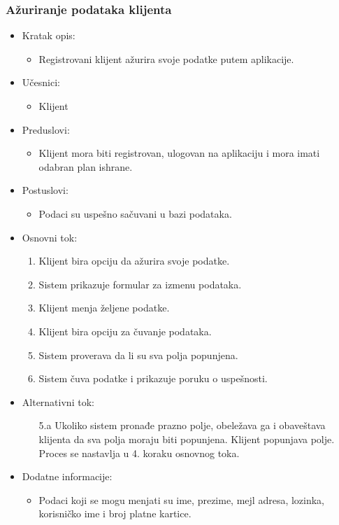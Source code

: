\subsubsection{Ažuriranje podataka klijenta}

\begin{itemize}
    \item Kratak opis:
        \begin{itemize}
            \item Registrovani klijent ažurira svoje podatke putem aplikacije.
        \end{itemize}
    \item Učesnici:
        \begin{itemize}
            \item Klijent
        \end{itemize}
    \item Preduslovi:
        \begin{itemize}
            \item Klijent mora biti registrovan, ulogovan na aplikaciju i mora imati odabran plan ishrane.
        \end{itemize}
    \item Postuslovi:
        \begin{itemize}
            \item Podaci su uspešno sačuvani u bazi podataka.
        \end{itemize}
    \item Osnovni tok:
        \begin{enumerate}
            \item Klijent bira opciju da ažurira svoje podatke.
            \item Sistem prikazuje formular za izmenu podataka.
            \item Klijent menja željene podatke. 
            \item Klijent bira opciju za čuvanje podataka.
            \item Sistem proverava da li su sva polja popunjena.
            \item Sistem čuva podatke i prikazuje poruku o uspešnosti.
        \end{enumerate}
    \item Alternativni tok:
        \begin{itemize}
            \item[5.a] Ukoliko sistem pronađe prazno polje, obeležava ga i obaveštava klijenta da sva polja moraju biti popunjena. Klijent popunjava polje. Proces se nastavlja u 4. koraku osnovnog toka.
        \end{itemize}
    \item Dodatne informacije:
        \begin{itemize}
            \item Podaci koji se mogu menjati su ime, prezime, mejl adresa, lozinka, korisničko ime i broj platne kartice.
        \end{itemize}
\end{itemize}

